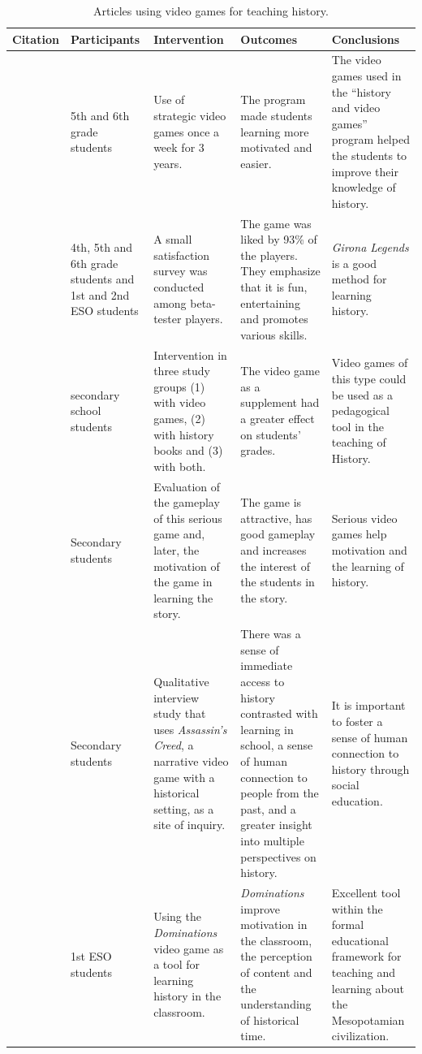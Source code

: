 \documentclass[english]{textolivre}
\begin{document}
\begin{footnotesize}
\begin{longtable}{
  >{\raggedright\arraybackslash}p{2cm}
  >{\raggedright\arraybackslash}p{2.2cm}
  >{\raggedright\arraybackslash}p{2.5cm}
  >{\raggedright\arraybackslash}p{3cm}
  >{\raggedright\arraybackslash}p{3cm}
}
\caption{Articles using video games for teaching history.}\label{tab01}
\\
\toprule
Citation & Participants & Intervention & Outcomes & Conclusions \\
\midrule
\textcite{bokolas_between_2019} & 5th and 6th grade students & Use of strategic video games once a week for 3 years. & The program made students learning more motivated and easier. & The video games used in the “history and video games” program helped the students to improve their knowledge of history. \\
\textcite{cornella_canals_design_2013} & 4th, 5th and 6th grade students and 1st and 2nd ESO students & A small satisfaction survey was conducted among beta-tester players. & The game was liked by 93\% of the players. They emphasize that it is fun, entertaining and promotes various skills. & \textit{Girona Legends} is a good method for learning history. \\
\textcite{evaristo_chiyong_uso_2016} & 561 secondary school students & Intervention in three study groups (1) with video games, (2) with history books and (3) with both. & The video game as a supplement had a greater effect on students’ grades. & Video games of this type could be used as a pedagogical tool in the teaching of History. \\
\textcite{gali_visiting_2019} & Secondary students & Evaluation of the gameplay of this serious game and, later, the motivation of the game in learning the story. & The game is attractive, has good gameplay and increases the interest of the students in the story. & Serious video games help motivation and the learning of history. \\
\textcite{gilbert__2019} & Secondary students & Qualitative interview study that uses \textit{Assassin’s Creed}, a narrative video game with a historical setting, as a site of inquiry. & There was a sense of immediate access to history contrasted with learning in school, a sense of human connection to people from the past, and a greater insight into multiple perspectives on history. & It is important to foster a sense of human connection to history through social education. \\
\textcite{jaldon-mendez_sanchez_uso_2021} & 1st ESO students & Using the \textit{Dominations} video game as a tool for learning history in the classroom. & \textit{Dominations} improve motivation in the classroom, the perception of content and the understanding of historical time. & Excellent tool within the formal educational framework for teaching and learning about the Mesopotamian civilization. \\

\end{longtable}
\end{footnotesize}
\end{document}
